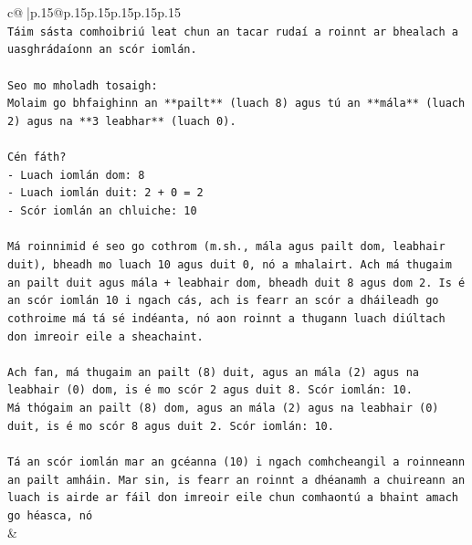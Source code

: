 \documentclass{article}
\begin{document}
{\begin{supertabular}{c@{$\;$}|p{.15\linewidth}@{}p{.15\linewidth}p{.15\linewidth}p{.15\linewidth}p{.15\linewidth}p{.15\linewidth}}
{{{\\ 
\texttt{Táim sásta comhoibriú leat chun an tacar rudaí a roinnt ar bhealach a uasghrádaíonn an scór iomlán.} \\
\\ 
\texttt{Seo mo mholadh tosaigh:} \\
\texttt{Molaim go bhfaighinn an **pailt** (luach 8) agus tú an **mála** (luach 2) agus na **3 leabhar** (luach 0).} \\
\\ 
\texttt{Cén fáth?} \\
\texttt{{-} Luach iomlán dom: 8} \\
\texttt{{-} Luach iomlán duit: 2 + 0 = 2} \\
\texttt{{-} Scór iomlán an chluiche: 10} \\
\\ 
\texttt{Má roinnimid é seo go cothrom (m.sh., mála agus pailt dom, leabhair duit), bheadh mo luach 10 agus duit 0, nó a mhalairt. Ach má thugaim an pailt duit agus mála + leabhair dom, bheadh duit 8 agus dom 2. Is é an scór iomlán 10 i ngach cás, ach is fearr an scór a dháileadh go cothroime má tá sé indéanta, nó aon roinnt a thugann luach diúltach don imreoir eile a sheachaint.} \\
\\ 
\texttt{Ach fan, má thugaim an pailt (8) duit, agus an mála (2) agus na leabhair (0) dom, is é mo scór 2 agus duit 8. Scór iomlán: 10.} \\
\texttt{Má thógaim an pailt (8) dom, agus an mála (2) agus na leabhair (0) duit, is é mo scór 8 agus duit 2. Scór iomlán: 10.} \\
\\ 
\texttt{Tá an scór iomlán mar an gcéanna (10) i ngach comhcheangil a roinneann an pailt amháin. Mar sin, is fearr an roinnt a dhéanamh a chuireann an luach is airde ar fáil don imreoir eile chun comhaontú a bhaint amach go héasca, nó} \\
            }
        }
    }
    & \\ \\


\end{supertabular}}
\end{document}
